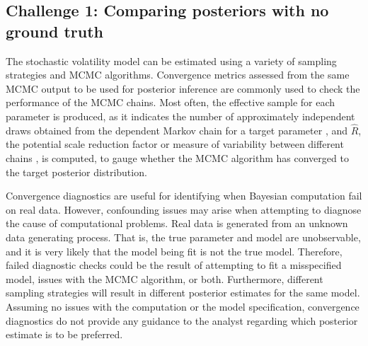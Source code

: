 \documentclass[12pt, a4paper]{article}
\begin{document}
\subsection{Challenge 1: Comparing posteriors with no ground truth}
    The stochastic volatility model can be estimated using a variety of sampling strategies and MCMC algorithms. Convergence metrics assessed from the same MCMC output to be used for posterior inference are commonly used to check the performance of the MCMC chains. Most often, the effective sample for each parameter is produced, as it indicates the number of approximately independent draws obtained from the dependent Markov chain for a target parameter \citep{gelman2013bayesian}, and $\hat{R}$, the potential scale reduction factor or measure of variability between different chains \citep{gelman1992inference}, is computed, to gauge whether the MCMC algorithm has converged to the target posterior distribution.

    Convergence diagnostics are useful for identifying when Bayesian computation fail on real data. However, confounding issues may arise when attempting to diagnose the cause of computational problems. Real data is generated from an unknown data generating process. That is, the true parameter and model are unobservable, and it is very likely that the model being fit is not the true model. Therefore, failed diagnostic checks could be the result of attempting to fit a misspecified model, issues with the MCMC algorithm, or both. Furthermore, different sampling strategies will result in different posterior estimates for the same model. Assuming no issues with the computation or the model specification, convergence diagnostics do not provide any guidance to the analyst regarding which posterior estimate is to be preferred.
\end{document}
